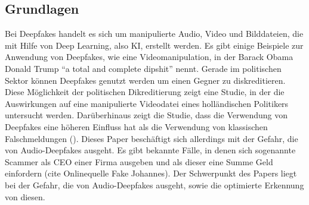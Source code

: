 \subsection{Grundlagen}
Bei Deepfakes handelt es sich um manipulierte Audio, Video und Bilddateien, die mit Hilfe von Deep Learning, also KI, erstellt werden.
Es gibt einige Beispiele zur Anwendung von Deepfakes, wie eine Videomanipulation, in der Barack Obama Donald Trump ``a total and complete dipshit'' nennt.
Gerade im politischen Sektor können Deepfakes genutzt werden um einen Gegner zu diskreditieren.
Diese Möglichkeit der politischen Dikreditierung zeigt eine Studie, in der die Auswirkungen auf eine manipulierte Videodatei eines holländischen Politikers untersucht werden.
Darüberhinaus zeigt die Studie, dass die Verwendung von Deepfakes eine höheren Einfluss hat als die Verwendung von klassischen Falschmeldungen (\cite{Dobber2020}).
Dieses Paper beschäftigt sich allerdings mit der Gefahr, die von Audio-Deepfakes ausgeht.
Es gibt bekannte Fälle, in denen sich sogenannte Scammer als CEO einer Firma ausgeben und als dieser eine Summe Geld einfordern (cite Onlinequelle Fake Johannes).
Der Schwerpunkt des Papers liegt bei der Gefahr, die von Audio-Deepfakes ausgeht, sowie die optimierte Erkennung von diesen.
